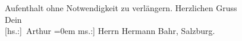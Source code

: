 \begin{ledgroupsized}[t]{13cm}
               Aufenthalt ohne Notwendigkeit zu verlängern.\pend
           \pstart
           Herzlichen Gruss{\\[\baselineskip]}Dein{\\[\baselineskip]}\spacefill\mbox{{[}hs.:{]} Arthur}\pend
           \leftskip=0em{}\pstart
           \noindent{}{[}ms.:{]} Herrn Hermann Bahr, Salzburg.\pend
           \endnumbering{}\end{ledgroupsized}  \newcommand{\dateiname}{L02129}\newcommand{\titel}{Arthur Schnitzler an Hermann Bahr, 22. 4. 1913}\newcommand{\editorInnen}{ Kurt Ifkovits,  Martin Anton Müller}
      